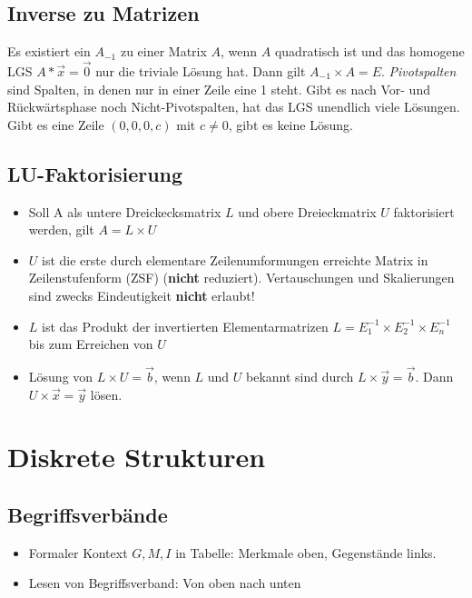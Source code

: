 \documentclass[12pt,landscape]{article}
\begin{document}
\begin{multicols}{3}
\subsection{Inverse zu Matrizen}
Es existiert ein $A_{-1}$ zu einer Matrix $A$, wenn $A$ quadratisch ist und das homogene LGS $A * \vec{x} = \vec{0}$ nur die triviale Lösung hat. Dann gilt $A_{-1} \times A = E$.
\textit{Pivotspalten} sind Spalten, in denen nur in einer Zeile eine 1 steht. Gibt es nach Vor- und Rückwärtsphase noch Nicht-Pivotspalten, hat das LGS unendlich viele Lösungen. Gibt es eine Zeile $(0,0,0,c)$ mit $c \neq 0$, gibt es keine Lösung.
\subsection{LU-Faktorisierung}
\begin{itemize}
\item Soll A als untere Dreickecksmatrix $L$ und obere Dreieckmatrix $U$ faktorisiert werden, gilt $A = L \times U$
\item $U$ ist die erste durch elementare Zeilenumformungen erreichte Matrix in Zeilenstufenform (ZSF) (\textbf{nicht} reduziert). Vertauschungen und Skalierungen sind zwecks Eindeutigkeit \textbf{nicht} erlaubt!
\item $L$ ist das Produkt der invertierten Elementarmatrizen $L = E_1^{-1} \times E_2^{-1} \times E_n^{-1}$ bis zum Erreichen von $U$
\item Lösung von $L \times U = \vec{b}$, wenn $L$ und $U$ bekannt sind durch $L \times \vec{y} = \vec{b}$. Dann $U \times \vec{x} = \vec{y}$ lösen.
\end{itemize}
\section{Diskrete Strukturen}
\subsection{Begriffsverbände}
\begin{itemize}
\item Formaler Kontext $G, M, I$ in Tabelle: Merkmale oben, Gegenstände links. 
\item Lesen von Begriffsverband: Von oben nach unten
\end{itemize}

\end{multicols}
\end{document}

